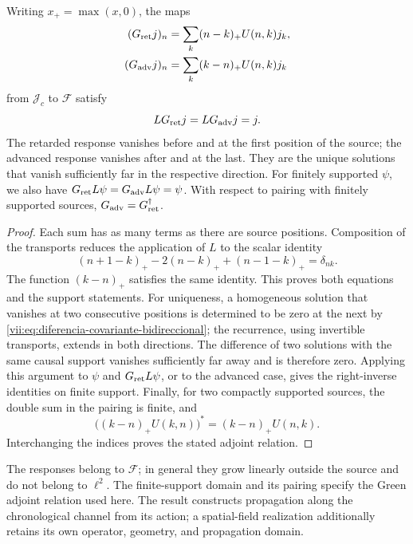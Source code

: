 \begin{theorem}
\label{vii:thm:green-cronologico}
Writing \(x_+=\max(x,0)\), the maps
\begin{align}
 (G_{\rm ret}j)_n&=\sum_k(n-k)_+U(n,k)j_k,\label{vii:eq:green-ret-cronologico}\\
 (G_{\rm adv}j)_n&=\sum_k(k-n)_+U(n,k)j_k\label{vii:eq:green-adv-cronologico}
\end{align}
from \(\mathcal J_c\) to \(\mathcal F\) satisfy
\[
 LG_{\rm ret}j=LG_{\rm adv}j=j.
\]
The retarded response vanishes before and at the first position of the
source; the advanced response vanishes after and at the last. They are the unique
solutions that vanish sufficiently far in the respective direction.
For finitely supported \(\psi\), we also have
\(G_{\rm ret}L\psi=G_{\rm adv}L\psi=\psi\).
With respect to pairing with finitely supported sources,
\(G_{\rm adv}=G_{\rm ret}^{\dagger}\).
\end{theorem}
\begin{proof}
Each sum has as many terms as there are source positions.
Composition of the transports reduces the application of \(L\) to
the scalar identity
\[
 (n+1-k)_+-2(n-k)_++(n-1-k)_+=\delta_{nk}.
\]
The function \((k-n)_+\) satisfies the same identity. This proves
both equations and the support statements. For uniqueness, a homogeneous
solution that vanishes at two consecutive positions is determined
to be zero at the next by \eqref{vii:eq:diferencia-covariante-bidireccional};
the recurrence, using invertible transports, extends in both
directions. The difference of two solutions with the same causal support
vanishes sufficiently far away and is therefore zero.
Applying this argument to \(\psi\) and \(G_{\rm ret}L\psi\), or to the
advanced case, gives the right-inverse identities on finite support.
Finally, for two compactly supported sources, the double sum in the pairing
is finite, and
\[
 \bigl((k-n)_+U(k,n)\bigr)^*=(k-n)_+U(n,k).
\]
Interchanging the indices proves the stated adjoint relation.
\end{proof}

The responses belong to \(\mathcal F\); in general they grow
linearly outside the source and do not belong to \(\ell^2\).
The finite-support domain and its pairing specify the Green adjoint
relation used here. The result constructs propagation along the chronological
channel from its action; a spatial-field realization additionally retains
its own operator, geometry, and propagation domain.


